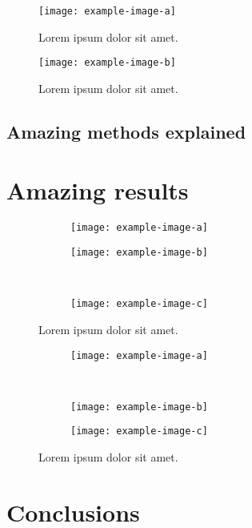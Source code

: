 \documentclass[10pt,a4paper]{article}
\begin{document}
\begin{figure}[htb]
    \centering
    \texttt{[image: example-image-a]}
    \caption{
        Lorem ipsum dolor sit amet.
    }
\end{figure}

\begin{figure}[htb]
    \centering
    \texttt{[image: example-image-b]}
    \caption{
        Lorem ipsum dolor sit amet.
    }
\end{figure}


\subsection{Amazing methods explained}
\label{sec:methods_explained}
% 
\lipsum[3]


\section{Amazing results}
\label{sec:results}
% 

\begin{figure}[htb]
    \centering
    \begin{subfigure}{0.3\textwidth}
        \centering
        \texttt{[image: example-image-a]}
    \end{subfigure}
    \begin{subfigure}{0.3\textwidth}
        \centering
        \texttt{[image: example-image-b]}
    \end{subfigure}\\
    \begin{subfigure}{0.3\textwidth}
        \centering
        \texttt{[image: example-image-c]}
    \end{subfigure}
    \caption{
        Lorem ipsum dolor sit amet.
    }
\end{figure}

\begin{figure}[htb]
    \centering
    \begin{subfigure}{0.3\textwidth}
        \centering
        \texttt{[image: example-image-a]}
    \end{subfigure}\\
    \begin{subfigure}{0.3\textwidth}
        \centering
        \texttt{[image: example-image-b]}
    \end{subfigure}
    \begin{subfigure}{0.3\textwidth}
        \centering
        \texttt{[image: example-image-c]}
    \end{subfigure}
    \caption{
        Lorem ipsum dolor sit amet.
    }
\end{figure}


\section{Conclusions}
\label{sec:conclusions}
% 
\lipsum[5]
\end{document}

